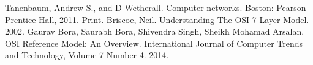 \pagebreak


\begin{thebibliography}{9}
Tanenbaum, Andrew S., and D Wetherall. Computer networks. Boston: Pearson Prentice Hall, 2011. Print.
Briscoe, Neil. Understanding The OSI 7-Layer Model. 2002.
Gaurav Bora, Saurabh Bora, Shivendra Singh, Sheikh Mohamad Arsalan. OSI Reference Model: An Overview. International Journal of Computer Trends and Technology, Volume 7 Number 4. 2014.


\end{thebibliography}

